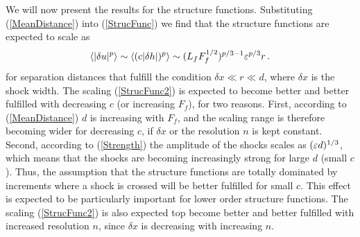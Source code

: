 We will now present the results for the structure functions. Substituting (\ref{MeanDistance}) into (\ref{StrucFunc}) we find that the structure functions are expected to scale as
\begin{equation} \label{StrucFunc2}
\langle |\delta u |^p \rangle  \sim \langle (c|\delta h |)^p \rangle \sim  (L_f F_f^{1/2})^{p/3-1}  \varepsilon^{p/3}  r  \, .
\end{equation}
for separation distances that fulfill the condition $ \delta x \ll r \ll d $, where $ \delta x $ is the shock width. The scaling (\ref{StrucFunc2}) is expected to become better and better fulfilled with decreasing $ c $ (or increasing $ F_f $), for two reasons. 
First, according to (\ref{MeanDistance}) $ d $ is increasing with $ F_f $, and the scaling range is therefore becoming wider for decreasing $ c $, if  $ \delta x $ or the resolution  $ n $ is kept constant. Second, according to (\ref{Strength}) the amplitude of the shocks scales as $ (\varepsilon d)^{1/3} $, which means that the shocks are becoming increasingly strong for large $ d $ (small $ c $). Thus, the assumption that the structure functions are totally dominated by increments where a shock is crossed will be better fulfilled for small $ c $. This effect is expected to be particularly important for lower order structure functions. The scaling (\ref{StrucFunc2}) is also expected top become better and better fulfilled with increased resolution $ n $, since $ \delta x $ is decreasing with increasing $ n $. 
 
